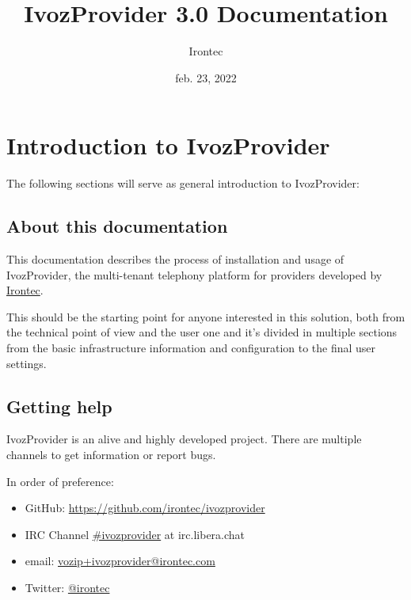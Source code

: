 \documentclass[letterpaper,10pt,spanish]{sphinxmanual}
\title{IvozProvider 3.0 Documentation}
\date{feb. 23, 2022}
\author{Irontec}
\begin{document}
\maketitle
\tableofcontents
{}\label{index::doc}



\chapter{Introduction to IvozProvider}
\label{basic_concepts/intro/index::doc}\label{basic_concepts/intro/index:introduction-to-ivozprovider}\label{basic_concepts/intro/index:ivozprovider-official-documentation}
The following sections will serve as general introduction to IvozProvider:


\section{About this documentation}
\label{basic_concepts/intro/about::doc}\label{basic_concepts/intro/about:about-this-documentation}
This documentation describes the process of installation and usage of
IvozProvider, the multi-tenant telephony platform for providers developed
by \href{http://irontec.com}{Irontec}.

This should be the starting point for anyone interested in this solution,
both from the technical point of view and the user one and it's divided
in multiple sections from the basic infrastructure information and configuration
to the final user settings.


\section{Getting help}
\label{basic_concepts/intro/getting_help:getting-help}\label{basic_concepts/intro/getting_help::doc}\label{basic_concepts/intro/getting_help:id1}
IvozProvider is an alive and highly developed project. There are
multiple channels to get information or report bugs.

In order of preference:
\begin{itemize}
\item {} 
GitHub: \url{https://github.com/irontec/ivozprovider}

\item {} 
IRC Channel \href{https://kiwiirc.com/nextclient/irc.libera.chat/\#ivozprovider}{\#ivozprovider} at irc.libera.chat

\item {} 
email: \href{mailto:vozip+ivozprovider@irontec.com}{vozip+ivozprovider@irontec.com}

\item {} 
Twitter: \href{https://twitter.com/irontec}{@irontec}

\end{itemize}
\end{document}
